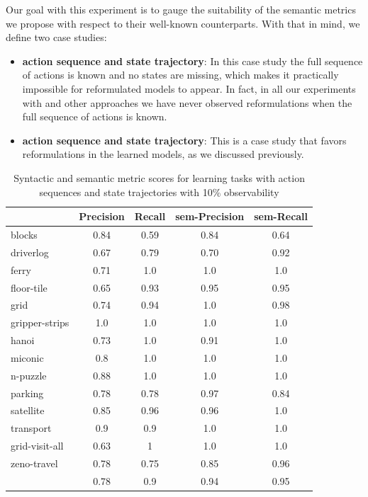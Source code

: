 Our goal with this experiment is to gauge the suitability of the semantic metrics we propose with respect to their well-known counterparts. With that in mind, we define two case studies:

\begin{itemize}
	\item \textbf{\FO action sequence and \PO state trajectory}: In this case study the full sequence of actions is known and no states are missing, which makes it practically impossible for reformulated models to appear. In fact, in all our experiments with \FAMA and other approaches we have never observed reformulations when the full sequence of actions is known.
	\item  \textbf{\NO action sequence and \NO state trajectory}: This is a case study that favors reformulations in the learned models, as we discussed previously.
\end{itemize}

\begin{table}[hbt!]
	\begin{center}		
		\begin{tabular}{l|c|c|c|c|}		
			& {\bf Precision} & {\bf Recall} & {\bf sem-Precision} & {\bf sem-Recall} \\
			\hline
			blocks & 0.84 & 0.59 & 0.84 & 0.64 \\
			driverlog & 0.67 & 0.79 & 0.70 & 0.92 \\
			ferry & 0.71 & 1.0 & 1.0 & 1.0 \\
			floor-tile & 0.65 & 0.93 & 0.95 & 0.95 \\
			grid & 0.74 & 0.94 & 1.0 & 0.98 \\
			gripper-strips & 1.0 & 1.0 & 1.0 & 1.0 \\
			hanoi & 0.73 & 1.0 & 0.91 & 1.0 \\
			miconic & 0.8 & 1.0	& 1.0 & 1.0 \\
			n-puzzle & 0.88 & 1.0 & 1.0 & 1.0 \\
			parking & 0.78 & 0.78 & 0.97 & 0.84 \\
			satellite & 0.85 & 0.96 & 0.96 & 1.0 \\
			transport & 0.9 & 0.9 & 1.0 & 1.0 \\
			grid-visit-all & 0.63 & 1 & 1.0 & 1.0 \\
			zeno-travel & 0.78 & 0.75 & 0.85 & 0.96 \\
			\hline
			& 0.78 & 0.9 & 0.94 & 0.95
		\end{tabular}
	\end{center}
	\caption{\small Syntactic and semantic metric scores for learning tasks with \FO action sequences and \PO state trajectories with 10\% observability}
	\label{tab:metric_comparison_100_10}
\end{table}

